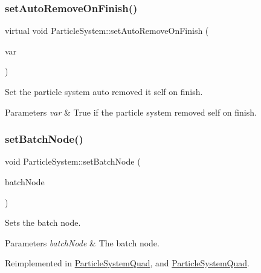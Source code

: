 \subsubsection{\texorpdfstring{set\+Auto\+Remove\+On\+Finish()}{setAutoRemoveOnFinish()}\hspace{0.1cm}{\footnotesize\ttfamily [2/2]}}
{\footnotesize\ttfamily virtual void Particle\+System\+::set\+Auto\+Remove\+On\+Finish (\begin{DoxyParamCaption}\item[{bool}]{var }\end{DoxyParamCaption})\hspace{0.3cm}{\ttfamily [virtual]}}

Set the particle system auto removed it self on finish.


\begin{DoxyParams}{Parameters}
{\em var} & True if the particle system removed self on finish. \\
\hline
\end{DoxyParams}
\mbox{\label{classParticleSystem_a7758a2ae122f4fb48568412c3ce75146}} 
\subsubsection{\texorpdfstring{set\+Batch\+Node()}{setBatchNode()}\hspace{0.1cm}{\footnotesize\ttfamily [1/2]}}
{\footnotesize\ttfamily void Particle\+System\+::set\+Batch\+Node (\begin{DoxyParamCaption}\item[{\hyperlink{classParticleBatchNode}{Particle\+Batch\+Node} $\ast$}]{batch\+Node }\end{DoxyParamCaption})\hspace{0.3cm}{\ttfamily [virtual]}}

Sets the batch node.


\begin{DoxyParams}{Parameters}
{\em batch\+Node} & The batch node. \\
\hline
\end{DoxyParams}


Reimplemented in \hyperlink{classParticleSystemQuad_aebafe7b796960463ca8c16358c8d819f}{Particle\+System\+Quad}, and \hyperlink{classParticleSystemQuad_a0609c28ee1074bae27e971af5693a37d}{Particle\+System\+Quad}.

